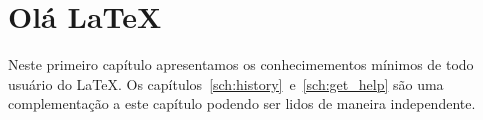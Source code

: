 % 
% 
% 
% 
% 
% 
%
%
\chapter{Ol\'{a} \LaTeX}
Neste primeiro cap\'{i}tulo apresentamos os conhecimementos m\'{i}nimos de todo usu\'{a}rio do LaTeX. Os cap\'{i}tulos~\ref{sch:history}~e~\ref{sch:get_help} s\~{a}o uma complementa\c{c}\~{a}o a este cap\'{i}tulo podendo ser lidos de maneira independente.

